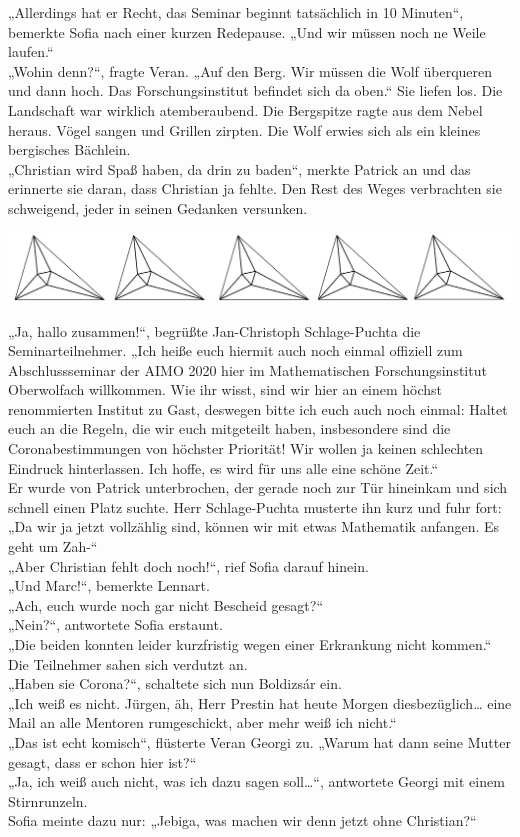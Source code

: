 \documentclass[oneside]{memoir}
\newcommand{\parasep}{
\bigskip
\bigskip
\begin{center} 
   \includegraphics[scale=.08]{parasep5.jpg} 
\end{center}
\bigskip
\bigskip
}
\begin{document}
„Allerdings hat er Recht, das Seminar beginnt tatsächlich in 10 Minuten“, bemerkte Sofia nach einer kurzen Redepause. „Und wir müssen noch ne Weile laufen.“  \\
„Wohin denn?“, fragte Veran. „Auf den Berg. Wir müssen die Wolf überqueren und dann hoch. Das Forschungsinstitut befindet sich da oben.“ Sie liefen los. Die Landschaft war wirklich atemberaubend. Die Bergspitze ragte aus dem Nebel heraus. Vögel sangen und Grillen zirpten. Die Wolf erwies sich als ein kleines bergisches Bächlein.  \\
„Christian wird Spaß haben, da drin zu baden“, merkte Patrick an und das erinnerte sie daran, dass Christian ja fehlte. Den Rest des Weges verbrachten sie schweigend, jeder in seinen Gedanken versunken.

\parasep

\noindent „Ja, hallo zusammen!“, begrüßte Jan-Christoph Schlage-Puchta die Seminarteilnehmer. „Ich heiße euch hiermit auch noch einmal offiziell zum Abschlussseminar der AIMO 2020 hier im Mathematischen Forschungsinstitut Oberwolfach willkommen. Wie ihr wisst, sind wir hier an einem höchst renommierten Institut zu Gast, deswegen bitte ich euch auch noch einmal: Haltet euch an die Regeln, die wir euch mitgeteilt haben, insbesondere sind die Coronabestimmungen von höchster Priorität! Wir wollen ja keinen schlechten Eindruck hinterlassen. Ich hoffe, es wird für uns alle eine schöne Zeit.“ \\
Er wurde von Patrick unterbrochen, der gerade noch zur Tür hineinkam und sich schnell einen Platz suchte. Herr Schlage-Puchta musterte ihn kurz und fuhr fort: „Da wir ja jetzt vollzählig sind, können wir mit etwas Mathematik anfangen. Es geht um Zah-“ \\
„Aber Christian fehlt doch noch!“, rief Sofia darauf hinein. \\
„Und Marc!“, bemerkte Lennart. \\
„Ach, euch wurde noch gar nicht Bescheid gesagt?“ \\
„Nein?“, antwortete Sofia erstaunt. \\
„Die beiden konnten leider kurzfristig wegen einer Erkrankung nicht kommen.“ \\
Die Teilnehmer sahen sich verdutzt an. \\
„Haben sie Corona?“, schaltete sich nun Boldizsár ein. \\
„Ich weiß es nicht. Jürgen, äh, Herr Prestin hat heute Morgen diesbezüglich\ldots{} eine Mail an alle Mentoren rumgeschickt, aber mehr weiß ich nicht.“ \\
„Das ist echt komisch“, flüsterte Veran Georgi zu. „Warum hat dann seine Mutter gesagt, dass er schon hier ist?“ \\
„Ja, ich weiß auch nicht, was ich dazu sagen soll\ldots“, antwortete Georgi mit einem Stirnrunzeln. \\
Sofia meinte dazu nur: „Jebiga, was machen wir denn jetzt ohne Christian?“
\end{document}
